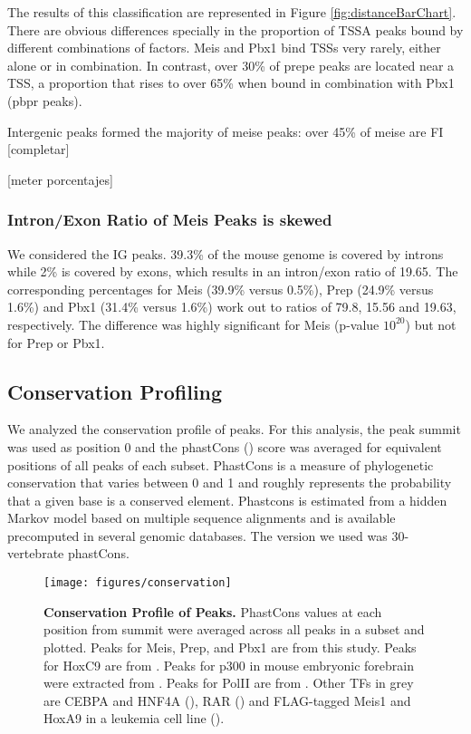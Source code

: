 The results of this classification are represented in Figure \ref{fig:distanceBarChart}. There are obvious differences specially in the proportion of \ac{TSSA} peaks bound by different combinations of factors. Meis and Pbx1 bind \acp{TSS} very rarely, either alone or in combination. In contrast, over 30\% of \ac{prepe} peaks are located near a \ac{TSS}, a proportion that rises to over 65\% when bound in combination with Pbx1 (\ac{pbpr} peaks).

Intergenic peaks formed the majority of \ac{meise} peaks: over 45\% of \ac{meise} are \ac{FI} [completar]

[meter porcentajes]

\subsubsection{Intron/Exon Ratio of Meis Peaks is skewed}

We considered the \ac{IG} peaks. 39.3\% of the mouse genome is covered by introns while 2\% is covered by exons, which results in an intron/exon ratio of 19.65. The corresponding percentages for Meis (39.9\% versus 0.5\%), Prep (24.9\% versus 1.6\%) and Pbx1 (31.4\% versus 1.6\%) work out to ratios of 79.8, 15.56 and 19.63, respectively. The difference was highly significant for Meis (p-value \< $10^20$) but not for Prep or Pbx1. 


\subsection{Conservation Profiling}

We analyzed the conservation profile of peaks. For this analysis, the peak summit was used as position 0 and the phastCons (\cite{Siepel2005}) score was averaged for equivalent positions of all peaks of each subset. PhastCons is a measure of phylogenetic conservation that varies between 0 and 1 and roughly represents the probability that a given base is a conserved element. Phastcons is estimated from a hidden Markov model based on multiple sequence alignments and is available precomputed in several genomic databases. The version we used was 30-vertebrate phastCons.

\begin{figure}[]
  \centering
  \texttt{[image: figures/conservation]}
  \caption[Conservation Profile of Peaks]{\textbf{Conservation Profile of Peaks.} PhastCons values at each position from summit were averaged across all peaks in a subset and plotted. Peaks for Meis, Prep, and Pbx1 are from this study. Peaks for HoxC9 are from \cite{Jung2010}. Peaks for p300 in mouse embryonic forebrain were extracted from \cite{Blow2010}. Peaks for PolII are from \cite{Mahony2011}. Other TFs in grey are CEBPA and HNF4A (\cite{Schmidt2010}), RAR (\cite{Mahony2011}) and FLAG-tagged Meis1 and HoxA9 in a leukemia cell line (\cite{Huang2012}).}
  \label{fig:conservation}
\end{figure}

